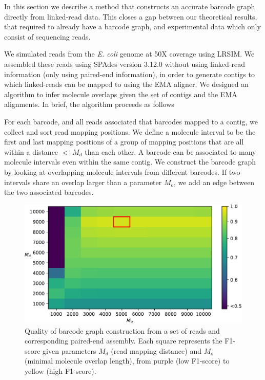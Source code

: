 \documentclass[a4paper,UKenglish,cleveref, autoref, thm-restate,authorcolumns]{lipics-v2019}
\begin{document}
In this section we describe a method that constructs an accurate barcode graph directly from linked-read data. This closes a gap between our theoretical results, that required to already have a barcode graph, and experimental data which only consist of sequencing reads.

We simulated reads from the \emph{E. coli} genome at 50X coverage using LRSIM. We assembled these reads using SPAdes version 3.12.0 without using linked-read information (only using paired-end information), in order to generate contigs to which linked-reads can be mapped to using the EMA aligner. We designed an algorithm to infer molecule overlaps given the set of contigs and the EMA alignments. In brief, the algorithm proceeds as follows

For each barcode, and all reads associated that barcodes mapped to a contig, we collect and sort read mapping positions. We define a molecule interval to be the first and last mapping positions of a group of mapping positions that are all within a distance $<$ $M_d$ than each other. A barcode can be associated to many molecule intervals even within the same contig. We construct the barcode graph by looking at overlapping molecule intervals from different barcodes. If two intervals share an overlap larger than a parameter $M_o$, we add an edge between the two associated barcodes.


\begin{figure}
    \centering
    \includegraphics[width=.68\textwidth]{barcode_graph_optimisation.pdf}
    \caption{Quality of barcode graph construction from a set of reads and corresponding paired-end assembly. Each square represents the F1-score given parameters $M_d$ (read mapping distance) and $M_o$ (minimal molecule overlap length), from  purple (low F1-score) to yellow (high F1-score). %
    }
    \label{fig:barcode_graph:parameter_opti}
\end{figure}
\end{document}
